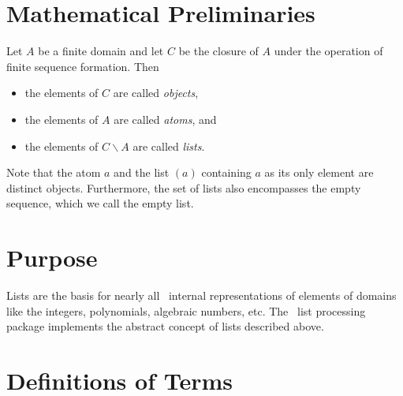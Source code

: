 \section{Mathematical Preliminaries}
\label{c:LP s:MP}

Let $A$ be a finite domain and let $C$ be the closure of $A$ under the
operation of finite sequence formation. Then
\begin{itemize}
\item the elements of $C$ are called {\em objects},
\item the elements of $A$ are called {\em atoms}, and
\item the elements of $C \backslash\! A$ are called {\em lists}.
\end{itemize}
Note that the atom $a$ and the list $(a)$ containing $a$ as its only
element are distinct objects. Furthermore, the set of lists also
encompasses the empty sequence, which we call the empty list.


\section{Purpose}
\label{c:LP s:P}

Lists are the basis for nearly all \saclib\ internal representations of
elements of domains like the integers, polynomials, algebraic numbers, etc.
The \saclib\ list processing package implements the abstract concept of
lists described above.


\section{Definitions of Terms}
\label{c:LP s:D}

